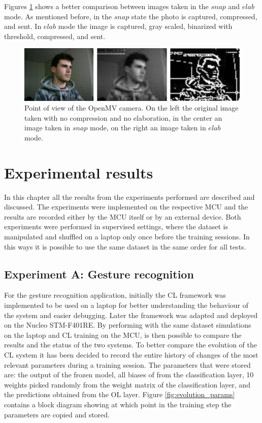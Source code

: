 \documentclass[12pt]{report}
\begin{document}
Figures \ref{fig:openmv_pov} shows a better comparison between images taken in the $snap$ and $elab$ mode. As mentioned before, in the $snap$ state the photo is captured, compressed, and sent. In $elab$ mode the image is captured, gray scaled, binarized with threshold, compressed, and sent.

\begin{figure}[h!]
    \centering
    \includegraphics[width=140mm]{Figures/Chapter4/openmv_pov.jpg} 
    \caption{Point of view of the OpenMV camera. On the left the original image taken with no compression and no elaboration, in the center an image taken in $snap$ mode, on the right an image taken in $elab$ mode.}
    \label{fig:openmv_pov}    
\end{figure}


\chapter{Experimental results} 
In this chapter all the results from the experiments performed are described and discussed. The experiments were implemented on the respective MCU and the results are recorded either by the MCU itself or by an external device. Both experiments were performed in supervised settings, where the dataset is manipulated and shuffled on a laptop only once before the training sessions. In this ways it is possible to use the same dataset in the same order for all tests.

\section{Experiment A: Gesture recognition}
For the gesture recognition application, initially the CL framework was implemented to be used on a laptop for better understanding the behaviour of the system and easier debugging. Later the framework was adapted and deployed on the Nucleo STM-F401RE. By performing with the same dataset simulations on the laptop and CL training on the MCU, is then possible to compare the results and the status of the two systems. To better compare the evolution of the CL system it has been decided to record the entire history of changes of the most relevant parameters during a training session. The parameters that were stored are: the output of the frozen model, all biases of from the classification layer, 10 weights picked randomly from the weight matrix of the classification layer, and the predictions obtained from the OL layer. Figure \ref{fig:evolution_params} contains a block diagram showing at which point in the training step the parameters are copied and stored. 
\end{document}
